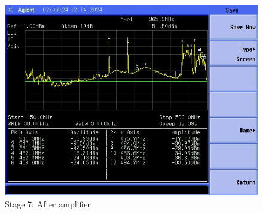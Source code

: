 \documentclass[letterpaper,12pt]{article}
\begin{document}
\begin{figure}[H]
	\begin{centering}
		\includegraphics[width=0.5\columnwidth]{figures/receiver_spectra/7.amp}
		\caption{Stage 7: After amplifier}
	\end{centering}
\end{figure}
\end{document}
